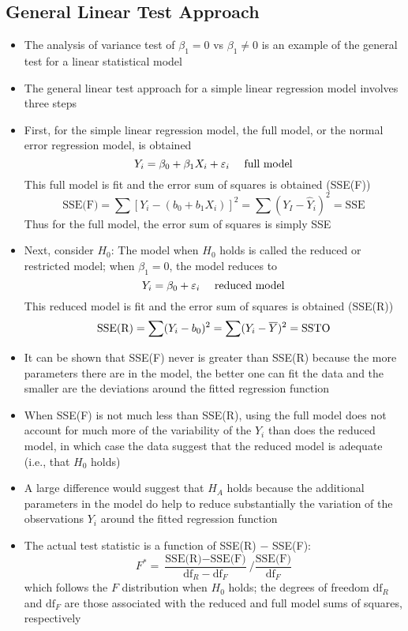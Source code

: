 \subsection{General Linear Test Approach}
\begin{itemize}
\item The analysis of variance test of $\beta_1 = 0$ vs $\beta_1 \neq 0$ is an example of the general test for a linear statistical model
\item The general linear test approach for a simple linear regression model involves three steps
\item First, for the simple linear regression model, the full model, or the normal error regression model, is obtained $$ Y_i = \beta_0 + \beta_1X_i + \varepsilon_i \text{~~~ full model} $$ 
This full model is fit and the error sum of squares is obtained (SSE(F)) $$ \text{SSE(F)} = \sum [Y_i - (b_0 + b_1X_i)]^2 = \sum (Y_I - \hat{Y}_i)^2 = \text{SSE} $$ Thus for the full model, the error sum of squares is simply SSE
\item Next, consider $H_0$:  The model when $H_0$ holds is called the reduced or restricted model; when $\beta_1 = 0$, the model reduces to $$ Y_i = \beta_0 + \varepsilon_i \text{~~~ reduced model} $$ This reduced model is fit and the error sum of squares is obtained (SSE(R)) $$ \text{SSE(R)} = \sum (Y_i - b_0)^2 = \sum (Y_i - \overline{Y})^2 = \text{SSTO} $$ 
\item It can be shown that SSE(F) never is greater than SSE(R) because the more parameters there are in the model, the better one can fit the data and the smaller are the deviations around the fitted regression function
\item When SSE(F) is not much less than SSE(R), using the full model does not account for much more of the variability of the $Y_i$ than does the reduced model, in which case the data suggest that the reduced model is adequate (i.e., that $H_0$ holds)
\item A large difference would suggest that $H_A$ holds because the additional parameters in the model do help to reduce substantially the variation of the observations $Y_i$ around the fitted regression function
\item The actual test statistic is a function of SSE(R) $-$ SSE(F): $$ F^* = \frac{\text{SSE(R)} - \text{SSE(F)}}{\text{df}_R - \text{df}_F} / \frac{\text{SSE(F)}}{\text{df}_F} $$ which follows the $F$ distribution when $H_0$ holds; the degrees of freedom $\text{df}_R$ and $\text{df}_F$ are those associated with the reduced and full model sums of squares, respectively

\end{itemize}
